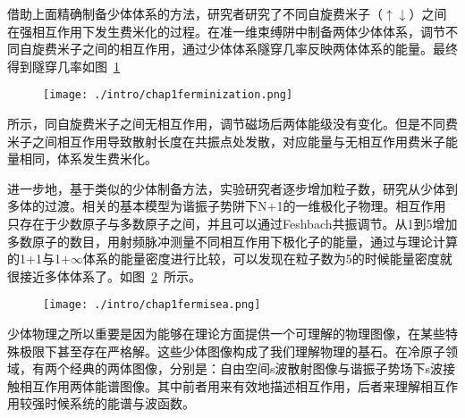 借助上面精确制备少体体系的方法，研究者研究了不同自旋费米子（$\uparrow\downarrow$）之间在强相互作用下发生费米化的过程\cite{zurn2012fermionization}。在准一维束缚阱中制备两体少体体系，调节不同自旋费米子之间的相互作用，通过少体体系隧穿几率反映两体体系的能量。最终得到隧穿几率如图~\ref{ferminization}~
\begin{figure}[!htbp]
    \centering
    \texttt{[image: ./intro/chap1ferminization.png]}
    \label{ferminization}
\end{figure}
所示，同自旋费米子之间无相互作用，调节磁场后两体能级没有变化。但是不同费米子之间相互作用导致散射长度在共振点处发散，对应能量与无相互作用费米子能量相同，体系发生费米化。

进一步地，基于类似的少体制备方法，实验研究者逐步增加粒子数，研究从少体到多体的过渡\cite{WenzFermiSeaOnebyOne}。相关的基本模型为谐振子势阱下N+1的一维极化子物理。相互作用只存在于少数原子与多数原子之间，并且可以通过Feshbach共振调节。从1到5增加多数原子的数目，用射频脉冲测量不同相互作用下极化子的能量，通过与理论计算的1+1与1+$\infty$体系的能量密度进行比较，可以发现在粒子数为5的时候能量密度就很接近多体体系了。如图~\ref{fermisea}~所示。
\begin{figure}[!htbp]
    \centering
    \texttt{[image: ./intro/chap1fermisea.png]}
    \label{fermisea}
\end{figure}

少体物理之所以重要是因为能够在理论方面提供一个可理解的物理图像，在某些特殊极限下甚至存在严格解。这些少体图像构成了我们理解物理的基石。在冷原子领域，有两个经典的两体图像，分别是：自由空间s波散射图像与谐振子势场下s波接触相互作用两体能谱图像。其中前者用来有效地描述相互作用，后者来理解相互作用较强时候系统的能谱与波函数。

